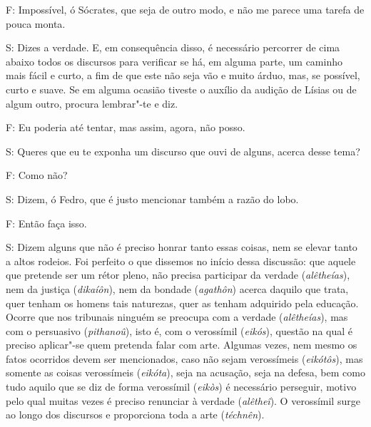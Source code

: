 F: Impossível, ó Sócrates, que seja de outro modo, e não me parece uma
tarefa de pouca monta.

 

S: Dizes a verdade. E, em consequência disso, é necessário percorrer de
cima abaixo todos os discursos para verificar se há, em alguma parte, um
caminho mais fácil e curto, \bekker{[272c]} a fim de que este não seja vão e
muito árduo, mas, se possível, curto e suave. Se em alguma ocasião
tiveste o auxílio da audição de Lísias ou de algum outro, procura
lembrar"-te e diz.

F: Eu poderia até tentar, mas assim, agora, não posso.

 

S: Queres que eu te exponha um discurso que ouvi de alguns, acerca desse
tema?

 

F: Como não?

 

S: Dizem, ó Fedro, que é justo mencionar também a razão do lobo.

 

\bekker{[272d]} F: Então faça isso.

 

S: Dizem alguns que não é preciso honrar tanto essas coisas, nem se
elevar tanto a altos rodeios. Foi perfeito o que dissemos no início
dessa discussão: que aquele que pretende ser um rétor pleno, não precisa
participar da verdade (\emph{alêtheías}), nem da justiça
(\emph{dikaíôn}), nem da bondade (\emph{agathôn}) acerca daquilo que
trata, quer tenham os homens tais naturezas, quer as tenham adquirido
pela educação. Ocorre que nos tribunais ninguém se preocupa com a
verdade (\emph{alêtheías}), mas com o persuasivo (\emph{pithanoû}), isto
é, com o verossímil (\emph{eikós}), questão na qual é preciso aplicar"-se
quem pretenda falar com arte. \bekker{[272e]} Algumas vezes, nem mesmo os
fatos ocorridos devem ser mencionados, caso não sejam verossímeis
(\emph{eikótôs}), mas somente as coisas verossímeis (\emph{eikóta}),
seja na acusação, seja na defesa, bem como tudo aquilo que se diz de
forma verossímil (\emph{eikòs}) é necessário perseguir, motivo pelo qual
muitas vezes é preciso renunciar à verdade (\emph{alêtheî}). \bekker{[273a]}
O verossímil surge ao longo dos discursos e proporciona toda a arte
(\emph{téchnên}).

